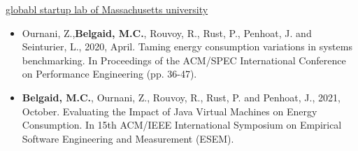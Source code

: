 \documentclass[10pt,a4paper,ragged2e,withhyper]{altacv}
\begin{document}
\begin{paracol}{2}
  \href{https://gsl.mit.edu/mit-global-startup-labs}{globabl startup lab of Massachusetts university}

  \medskip


  \medskip

  \divider


  \divider





  \medskip


  \divider

  \divider


  \switchcolumn
  \medskip


  \medskip

  \begin{itemize}
    \item  Ournani, Z.,\textbf{Belgaid, M.C.}, Rouvoy, R., Rust, P., Penhoat, J. and Seinturier, L., 2020, April. Taming energy consumption variations in systems benchmarking. In Proceedings of the ACM/SPEC International Conference on Performance Engineering (pp. 36-47).
          \medskip
    \item  \textbf{Belgaid, M.C.}, Ournani, Z., Rouvoy, R., Rust, P. and Penhoat, J., 2021, October. Evaluating the Impact of Java Virtual Machines on Energy Consumption. In 15th ACM/IEEE International Symposium on Empirical Software Engineering and Measurement (ESEM).

  \end{itemize}


\end{paracol}
\end{document}
